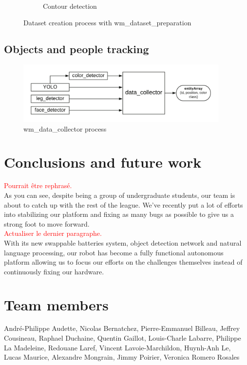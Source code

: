 \documentclass[runningheads,a4paper]{llncs}
\newcommand\notes[1]{\textcolor{red}{#1}}
\begin{document}
\begin{figure}[h!]
\begin{subfigure}[b]{0.3\linewidth}
    \caption{Contour detection}
  \end{subfigure}
  \caption{Dataset creation process with wm_dataset_preparation}
  \label{fig:coffee}
\end{figure}  
 
 

\subsection{Objects and people tracking}

\begin{figure}
  \centering
  \includegraphics[width=300pt]{images/wm_data_collector.png}
  \caption{ wm\_data\_collector process}
\end{figure} 

\newpage

\section{Conclusions and future work} 
\notes{Pourrait être rephrasé.}\\
\tab As you can see, despite being a group of undergraduate students, our team is about to catch up with the rest of the league. We’ve recently put a lot of efforts into stabilizing our platform and fixing as many bugs as possible to give us a strong foot to move forward.\\

\notes{Actualiser le dernier paragraphe.}\\
With its new swappable batteries system, object detection network and natural language processing, our robot has become a fully functional autonomous platform allowing us to focus our efforts on the challenges themselves instead of continuously fixing our hardware.
\\


	
\section*{Team members}
André-Philippe Audette,
Nicolas Bernatchez,
Pierre-Emmanuel Billeau,
Jeffrey Cousineau, 
Raphael Duchaine,
Quentin Gaillot,
Louis-Charle Labarre, 
Philippe La Madeleine,  
Redouane Laref,
Vincent Lavoie-Marchildon,
Huynh-Anh Le,
Lucas Maurice,
Alexandre Mongrain,
Jimmy Poirier,
Veronica Romero Rosales

\nocite{*}


\end{document}
